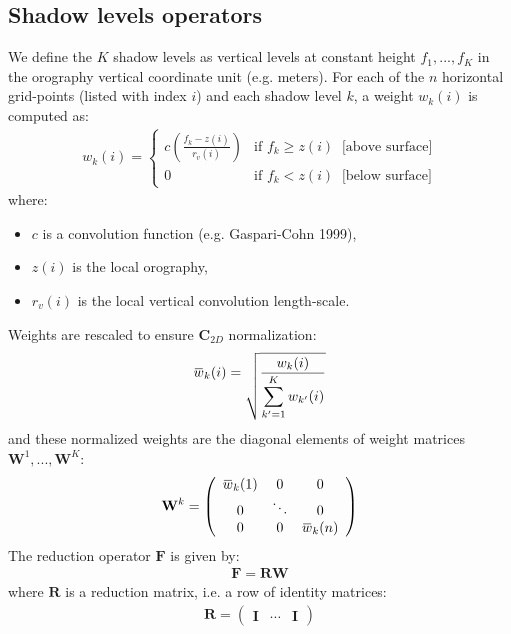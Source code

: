 \documentclass[12pt]{scrartcl}
\newcommand{\overbar}[1]{\mkern 1.5mu\overline{\mkern-1.5mu#1\mkern-1.5mu}\mkern 1.5mu}
\begin{document}
\subsection{Shadow levels operators}
We define the $K$ shadow levels as vertical levels at constant height ${f_1, ..., f_K}$ in the orography vertical coordinate unit (e.g. meters). For each of the $n$ horizontal grid-points (listed with index $i$) and each shadow level $k$, a weight $w_k(i)$ is computed as:
\begin{align}
w_k(i) = \left\{ \begin{array}{cl}
c\left(\displaystyle \frac{f_k - z(i)}{r_v(i)}\right) & \text{if } f_k \ge z(i) \ \text{ [above surface]}\\
0 & \text{if } f_k < z(i) \ \text{ [below surface]}
\end{array} \right.
\end{align}
where:
\begin{itemize}
\item $c$ is a convolution function (e.g. Gaspari-Cohn 1999),
\item $z(i)$ is the local orography,
\item $r_v(i)$ is the local vertical convolution length-scale.
\end{itemize}
Weights are rescaled to ensure $\mathbf{C}_{2D}$ normalization:
\begin{align}
\overbar{w}_k(i) = \sqrt{\frac{w_k(i)}{\displaystyle \sum_{k'=1}^K w_{k'}(i)}}
\end{align}
and these normalized weights are the diagonal elements of weight matrices $\mathbf{W}^1, ..., \mathbf{W}^K$:
\begin{align}
\mathbf{W}^k = \left(\begin{array}{ccc}
\overbar{w}_k(1) & 0 & 0 \\
0 & \ddots & 0 \\
0 & 0 & \overbar{w}_k(n)
\end{array} \right)
\end{align}
The reduction operator $\mathbf{F}$ is given by:
\begin{align}
\mathbf{F} = \mathbf{R} \mathbf{W}
\end{align}
where $\mathbf{R}$ is a reduction matrix, i.e. a row of identity matrices:
\begin{align}
\mathbf{R} = \left(\begin{array}{ccc}
\mathbf{I} & \cdots & \mathbf{I}
\end{array}\right)
\end{align}
\end{document}
